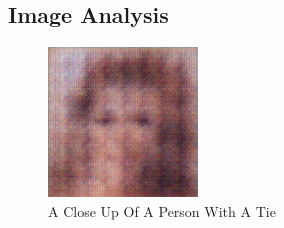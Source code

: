 \documentclass{article}%
\begin{document}
%
\subsection{Image Analysis}%
\label{subsec:ImageAnalysis}%


\begin{figure}[h!]%
\centering%
\includegraphics[width=150px]{500_fake_images/samples_5_97.png}%
\caption{A Close Up Of A Person With A Tie}%
\end{figure}

%
\end{document}
